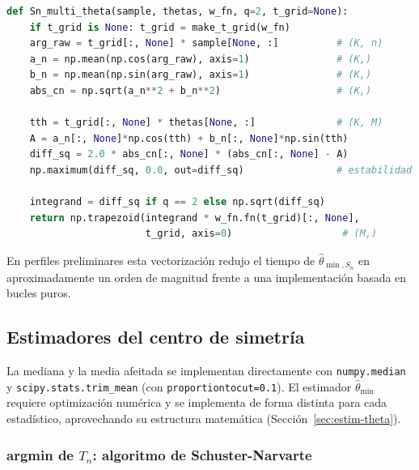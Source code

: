\begin{lstlisting}[language=Python]
def Sn_multi_theta(sample, thetas, w_fn, q=2, t_grid=None):
    if t_grid is None: t_grid = make_t_grid(w_fn)
    arg_raw = t_grid[:, None] * sample[None, :]          # (K, n)
    a_n = np.mean(np.cos(arg_raw), axis=1)               # (K,)
    b_n = np.mean(np.sin(arg_raw), axis=1)               # (K,)
    abs_cn = np.sqrt(a_n**2 + b_n**2)                    # (K,)

    tth = t_grid[:, None] * thetas[None, :]              # (K, M)
    A = a_n[:, None]*np.cos(tth) + b_n[:, None]*np.sin(tth)
    diff_sq = 2.0 * abs_cn[:, None] * (abs_cn[:, None] - A)
    np.maximum(diff_sq, 0.0, out=diff_sq)                # estabilidad

    integrand = diff_sq if q == 2 else np.sqrt(diff_sq)
    return np.trapezoid(integrand * w_fn.fn(t_grid)[:, None],
                        t_grid, axis=0)                   # (M,)
\end{lstlisting}

En perfiles preliminares esta vectorización redujo el tiempo de $\hat\theta_{\min,S_n}$ en aproximadamente un orden de magnitud frente a una implementación basada en bucles puros.

\subsection{Estimadores del centro de simetría}

La mediana y la media afeitada se implementan directamente con \texttt{numpy.median} y \texttt{scipy.stats.trim\_mean} (con \texttt{proportiontocut=0.1}). El estimador $\hat\theta_{\min}$ requiere optimización numérica y se implementa de forma distinta para cada estadístico, aprovechando su estructura matemática (Sección~\ref{sec:estim-theta}).

\subsubsection{argmin de \texorpdfstring{$T_n$}{Tn}: algoritmo de Schuster-Narvarte}\label{impl:argmin-Tn}


